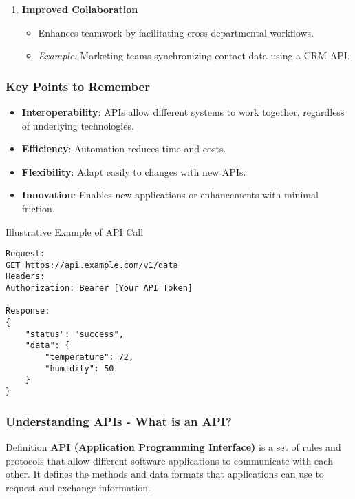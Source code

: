 \documentclass[aspectratio=169]{beamer}
\begin{document}
\begin{frame}[fragile]
\begin{enumerate}
\begin{itemize}
                \item \textit{Example:} Social media dashboards pulling analytics using different APIs.
            \end{itemize}
        \item \textbf{Improved Collaboration}
            \begin{itemize}
                \item Enhances teamwork by facilitating cross-departmental workflows.
                \item \textit{Example:} Marketing teams synchronizing contact data using a CRM API.
            \end{itemize}
    \end{enumerate}
\end{frame}

\begin{frame}[fragile]
    \frametitle{Key Points to Remember}
    \begin{itemize}
        \item \textbf{Interoperability}: APIs allow different systems to work together, regardless of underlying technologies.
        \item \textbf{Efficiency}: Automation reduces time and costs.
        \item \textbf{Flexibility}: Adapt easily to changes with new APIs.
        \item \textbf{Innovation}: Enables new applications or enhancements with minimal friction.
    \end{itemize}
    
    \begin{block}{Illustrative Example of API Call}
    \begin{lstlisting}
Request:
GET https://api.example.com/v1/data
Headers:
Authorization: Bearer [Your API Token]

Response:
{
    "status": "success",
    "data": {
        "temperature": 72,
        "humidity": 50
    }
}
    \end{lstlisting}
    \end{block}
\end{frame}

\begin{frame}[fragile]
    \frametitle{Understanding APIs - What is an API?}
    \begin{block}{Definition}
        \textbf{API (Application Programming Interface)} is a set of rules and protocols that allow different software applications to communicate with each other. 
        It defines the methods and data formats that applications can use to request and exchange information.
    \end{block}
\end{frame}
\end{document}
